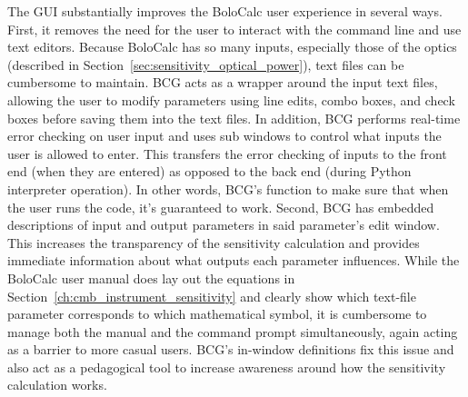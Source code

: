 The GUI substantially improves the BoloCalc user experience in several ways. First, it removes the need for the user to interact with the command line and use text editors. Because BoloCalc has so many inputs, especially those of the optics (described in Section~\ref{sec:sensitivity_optical_power}), text files can be cumbersome to maintain. BCG acts as a wrapper around the input text files, allowing the user to modify parameters using line edits, combo boxes, and check boxes before saving them into the text files. In addition, BCG performs real-time error checking on user input and uses sub windows to control what inputs the user is allowed to enter. This transfers the error checking of inputs to the front end (when they are entered) as opposed to the back end (during Python interpreter operation). In other words, BCG's function to make sure that when the user runs the code, it's guaranteed to work. Second, BCG has embedded descriptions of input and output parameters in said parameter's edit window. This increases the transparency of the sensitivity calculation and provides immediate information about what outputs each parameter influences. While the BoloCalc user manual does lay out the equations in Section~\ref{ch:cmb_instrument_sensitivity} and clearly show which text-file parameter corresponds to which mathematical symbol, it is cumbersome to manage both the manual and the command prompt simultaneously, again acting as a barrier to more casual users. BCG's in-window definitions fix this issue and also act as a pedagogical tool to increase awareness around how the sensitivity calculation works.

